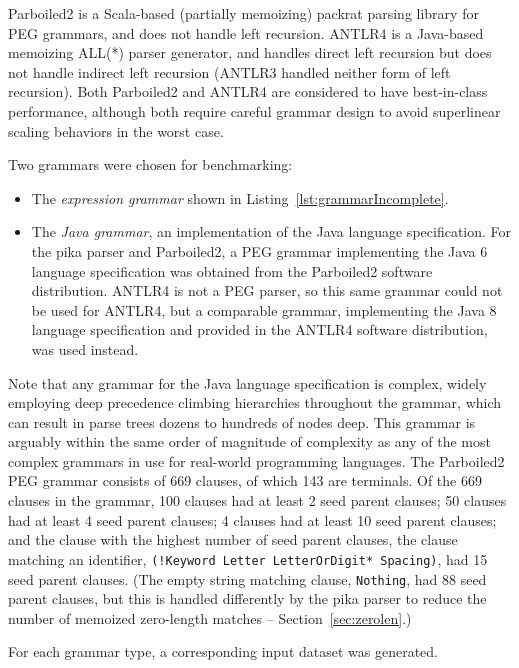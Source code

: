 \documentclass[manuscript,screen]{acmart}
\begin{document}
Parboiled2 is a Scala-based (partially memoizing) packrat parsing library for PEG grammars, and does not handle left recursion. ANTLR4 is a Java-based memoizing ALL(*) parser generator, and handles direct left recursion but does not handle indirect left recursion (ANTLR3 handled neither form of left recursion). Both Parboiled2 and ANTLR4 are considered to have best-in-class performance, although both require careful grammar design to avoid superlinear scaling behaviors in the worst case.

Two grammars were chosen for benchmarking:

\begin{itemize}
    \item The \emph{expression grammar} shown in Listing~\ref{lst:grammarIncomplete}.
    \item The \emph{Java grammar}, an implementation of the Java language specification. For the pika parser and Parboiled2, a PEG grammar implementing the Java 6 language specification was obtained from the Parboiled2 software distribution. ANTLR4 is not a PEG parser, so this same grammar could not be used for ANTLR4, but a comparable grammar, implementing the Java 8 language specification and provided in the ANTLR4 software distribution, was used instead.
\end{itemize}

Note that any grammar for the Java language specification is complex, widely employing deep precedence climbing hierarchies throughout the grammar, which can result in parse trees dozens to hundreds of nodes deep. This grammar is arguably within the same order of magnitude of complexity as any of the most complex grammars in use for real-world programming languages. The Parboiled2 PEG grammar consists of 669 clauses, of which 143 are terminals. Of the 669 clauses in the grammar, 100 clauses had at least 2 seed parent clauses; 50 clauses had at least 4 seed parent clauses; 4 clauses had at least 10 seed parent clauses; and the clause with the highest number of seed parent clauses, the clause matching an identifier, \texttt{(!Keyword Letter LetterOrDigit* Spacing)}, had 15 seed parent clauses. (The empty string matching clause, \texttt{Nothing}, had 88 seed parent clauses, but this is handled differently by the pika parser to reduce the number of memoized zero-length matches -- Section~\ref{sec:zerolen}.)

For each grammar type, a corresponding input dataset was generated.
\end{document}
